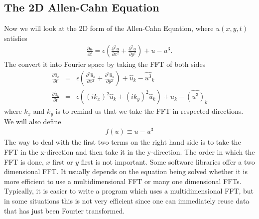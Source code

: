\subsection{The 2D Allen-Cahn Equation}
Now we will look at the 2D form of the Allen-Cahn Equation, where $u(x,y,t)$ satisfies
\begin{eqnarray}
\frac{\partial u}{\partial t} = \epsilon\left(\frac{\partial^2 u}{\partial x^2}+\frac{\partial^2 u}{\partial y^2}\right)+u-u^3. \label{eq:AllCah2D}
\end{eqnarray}
The convert it into Fourier space by taking the FFT of both sides
\begin{eqnarray}
\frac{\partial \hat{u}_k}{\partial t} &=& \epsilon\left(\frac{\partial^2 \hat{u}_k}{\partial x^2}+\frac{\partial^2 \hat{u}_k}{\partial y^2}\right)+\hat{u}_k-\widehat{u^3}_k\\
\frac{\partial \hat{u}_k}{\partial t} &=& \epsilon\left((ik_x)^2\hat{u}_k+(ik_y)^2\hat{u}_k\right)+\hat{u}_k-\widehat{(u^3)}_k \label{eq:Allen_Cahn_2D}
\end{eqnarray}
where $k_x$ and $k_y$ is to remind us that we take the FFT in respected directions. We will also define
\begin{eqnarray}
f(u) \equiv u-u^3 \label{eq:nonlinear}
\end{eqnarray}
The way to deal with the first two terms on the right hand side is to take the FFT in the x-direction and then take it in the y-direction. The order in which the FFT is done, $x$ first or $y$ first is not important. Some software libraries offer a two dimensional FFT. It usually depends on the equation being solved whether it is more efficient to use a multidimensional FFT or many one dimensional FFTs. Typically, it is easier to write a program which uses a multidimensional FFT, but in some situations this is not very efficient since one can immediately reuse data that has just been Fourier transformed.
